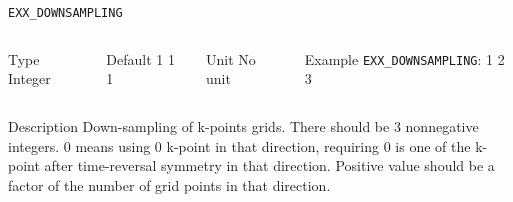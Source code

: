 \begin{frame}[allowframebreaks]{\texttt{EXX\_DOWNSAMPLING}} \label{EXX_DOWNSAMPLING}
\vspace*{-12pt}
\begin{columns}
\begin{block}{Type}
Integer
\end{block}

\begin{block}{Default}
1 1 1
\end{block}

\begin{block}{Unit}
No unit
\end{block}

\begin{block}{Example}
\texttt{EXX\_DOWNSAMPLING}: 1 2 3
\end{block}
\end{columns}

\begin{block}{Description}
Down-sampling of k-points grids. There should be 3 nonnegative integers. 0 means using 0 k-point in that direction, 
requiring 0 is one of the k-point after time-reversal symmetry in that direction. 
Positive value should be a factor of the number of grid points in that direction. 
\end{block}

\end{frame}


